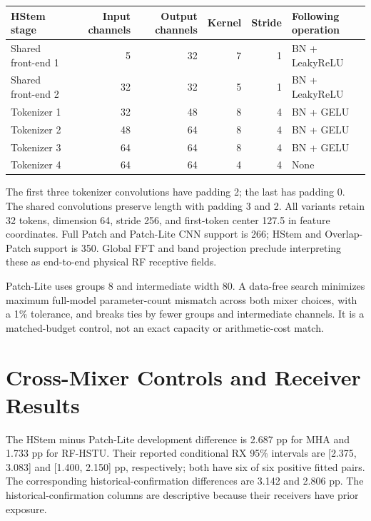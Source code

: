 \documentclass[11pt]{article}
\begin{document}
\begin{table}[htbp]\centering\small
\begin{tabular}{lrrrrl}\toprule
HStem stage & Input channels & Output channels & Kernel & Stride & Following operation\\\midrule
Shared front-end 1 & 5 & 32 & 7 & 1 & BN + LeakyReLU\\
Shared front-end 2 & 32 & 32 & 5 & 1 & BN + LeakyReLU\\
Tokenizer 1 & 32 & 48 & 8 & 4 & BN + GELU\\
Tokenizer 2 & 48 & 64 & 8 & 4 & BN + GELU\\
Tokenizer 3 & 64 & 64 & 8 & 4 & BN + GELU\\
Tokenizer 4 & 64 & 64 & 4 & 4 & None\\\bottomrule
\end{tabular}
\end{table}

The first three tokenizer convolutions have padding 2; the last has padding 0. The shared convolutions preserve length with padding 3 and 2. All variants retain 32 tokens, dimension 64, stride 256, and first-token center 127.5 in feature coordinates. Full Patch and Patch-Lite CNN support is 266; HStem and Overlap-Patch support is 350. Global FFT and band projection preclude interpreting these as end-to-end physical RF receptive fields.

Patch-Lite uses groups 8 and intermediate width 80. A data-free search minimizes maximum full-model parameter-count mismatch across both mixer choices, with a 1\% tolerance, and breaks ties by fewer groups and intermediate channels. It is a matched-budget control, not an exact capacity or arithmetic-cost match.

\section{Cross-Mixer Controls and Receiver Results}
\begin{table}[htbp]\centering
\caption{Same-stage S15 controls. These RF-HSTU numbers are not the different historical S06 best result.}\label{tab:mixers}

\end{table}

The HStem minus Patch-Lite development difference is 2.687 pp for MHA and 1.733 pp for RF-HSTU. Their reported conditional RX 95\% intervals are [2.375, 3.083] and [1.400, 2.150] pp, respectively; both have six of six positive fitted pairs. The corresponding historical-confirmation differences are 3.142 and 2.806 pp. The historical-confirmation columns are descriptive because their receivers have prior exposure.
\end{document}
